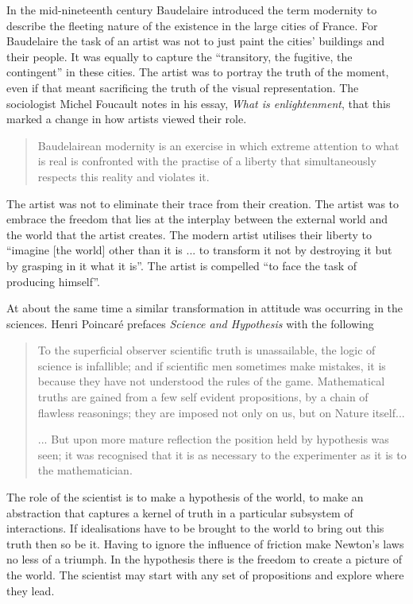 In the mid-nineteenth century Baudelaire introduced the term modernity 
to describe the fleeting nature of the existence in the large cities of France.
For Baudelaire the task of an artist was not to just paint the cities' buildings and their people.  
It was equally to capture the ``transitory, the fugitive, the contingent''\cite{BoudelairePainterofModernLife} in these cities.
The artist was to portray the truth of the moment, even if that meant sacrificing the truth of the visual representation.
The sociologist Michel Foucault notes in his essay, {\em What is enlightenment}\cite{FoucaultWhatIsEnlightenment}, that this marked a change in how artists viewed their role.
\begin{quote}
  Baudelairean modernity is an exercise in which extreme attention to
  what is real is confronted with the practise of a liberty that
  simultaneously respects this reality and violates it.
\end{quote}
The artist was not to eliminate their trace from their creation.  
The artist was to embrace the freedom
that lies at the interplay between the external world  and the world
that the artist creates.  The modern artist utilises their liberty to ``imagine 
[the world] other than it is ... to transform it not by destroying it but by grasping in it
what it is''. 
The artist is compelled ``to face the task of producing himself''\cite{FoucaultWhatIsEnlightenment}.


At about the same time a similar transformation in attitude was occurring in the sciences.
Henri Poincar{\'e} prefaces {\em Science and Hypothesis}\cite*{Poincare1902} with the following 
\begin{quote}
 To the superficial observer scientific truth is unassailable,
 the logic of science is infallible;
 and if scientific men sometimes make mistakes,
 it is because they have not understood the rules of the game.
 Mathematical truths are gained from a few self evident propositions,
 by a chain of flawless reasonings; they are imposed not only on us, but on Nature itself...

 ... But upon more mature reflection the position held by hypothesis was seen; it was recognised that it is as necessary to the experimenter as it is to the mathematician.
\end{quote}
The role of the scientist is to make a hypothesis of the world, to make an abstraction that captures a kernel of truth in a particular subsystem of interactions.
If idealisations have to be brought to the world to bring out this truth then so be it.
Having to ignore the influence of friction make Newton's laws no less of a triumph.
In the hypothesis there is the freedom to create a picture of the world.
The scientist may start with any set of propositions and explore where they lead.

